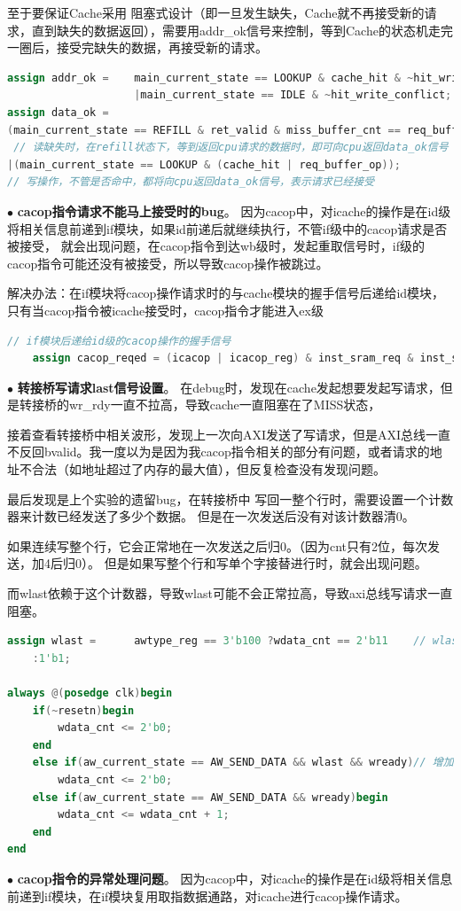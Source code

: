 \documentclass[11pt]{article}
\begin{document}
至于要保证Cache采用
阻塞式设计（即一旦发生缺失，Cache就不再接受新的请求，直到缺失的数据返回），需要用addr\_ok信号来控制，等到Cache的状态机走完一圈后，接受完缺失的数据，再接受新的请求。

\begin{lstlisting}[language=verilog]
assign addr_ok =    main_current_state == LOOKUP & cache_hit & ~hit_write_conflict      // 如果发生数据缺失，Cache拉低add_ok，不接受新的请求
                    |main_current_state == IDLE & ~hit_write_conflict;
assign data_ok =    
(main_current_state == REFILL & ret_valid & miss_buffer_cnt == req_buffer_offset[3:2] & ~req_buffer_op) 
 // 读缺失时，在refill状态下，等到返回cpu请求的数据时，即可向cpu返回data_ok信号
|(main_current_state == LOOKUP & (cache_hit | req_buffer_op)); 
// 写操作，不管是否命中，都将向cpu返回data_ok信号，表示请求已经接受
\end{lstlisting}
\noindent
$\bullet$
\textbf{cacop指令请求不能马上接受时的bug}。
因为cacop中，对icache的操作是在id级将相关信息前递到if模块，如果id前递后就继续执行，不管if级中的cacop请求是否被接受，
就会出现问题，在cacop指令到达wb级时，发起重取信号时，if级的cacop指令可能还没有被接受，所以导致cacop操作被跳过。

解决办法：在if模块将cacop操作请求时的与cache模块的握手信号后递给id模块，只有当cacop指令被icache接受时，cacop指令才能进入ex级
\begin{lstlisting}[language=verilog]
    // if模块后递给id级的cacop操作的握手信号
    assign cacop_reqed = (icacop | icacop_reg) & inst_sram_req & inst_sram_addr_ok;
\end{lstlisting}
\noindent
$\bullet$
\textbf{转接桥写请求last信号设置}。
在debug时，发现在cache发起想要发起写请求，但是转接桥的wr\_rdy一直不拉高，导致cache一直阻塞在了MISS状态，

接着查看转接桥中相关波形，发现上一次向AXI发送了写请求，但是AXI总线一直不反回bvalid。我一度以为是因为我cacop指令相关的部分有问题，或者请求的地址不合法（如地址超过了内存的最大值），但反复检查没有发现问题。

最后发现是上个实验的遗留bug，在转接桥中
写回一整个行时，需要设置一个计数器来计数已经发送了多少个数据。
但是在一次发送后没有对该计数器清0。

如果连续写整个行，它会正常地在一次发送之后归0。（因为cnt只有2位，每次发送，加4后归0）。
但是如果写整个行和写单个字接替进行时，就会出现问题。


而wlast依赖于这个计数器，导致wlast可能不会正常拉高，导致axi总线写请求一直阻塞。
\begin{lstlisting}[language=verilog]
assign wlast =      awtype_reg == 3'b100 ?wdata_cnt == 2'b11    // wlast依赖于计数器
    :1'b1;

always @(posedge clk)begin
    if(~resetn)begin
        wdata_cnt <= 2'b0;
    end
    else if(aw_current_state == AW_SEND_DATA && wlast && wready)// 增加了清0逻辑
        wdata_cnt <= 2'b0;
    else if(aw_current_state == AW_SEND_DATA && wready)begin
        wdata_cnt <= wdata_cnt + 1;
    end
end

\end{lstlisting}
\noindent
$\bullet$
\textbf{cacop指令的异常处理问题}。
因为cacop中，对icache的操作是在id级将相关信息前递到if模块，在if模块复用取指数据通路，对icache进行cacop操作请求。
\end{document}

